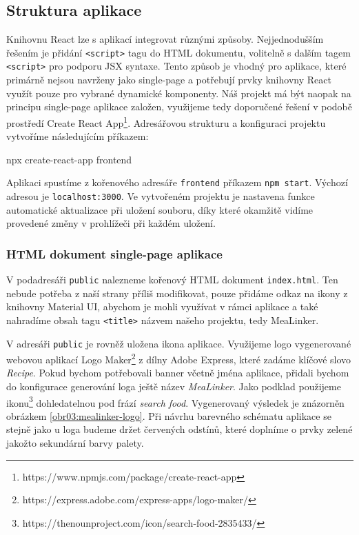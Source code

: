 \subsection{Struktura aplikace}

Knihovnu React lze s aplikací integrovat různými způsoby. Nejjednodušším řešením je přidání \texttt{<script>} tagu do HTML dokumentu, volitelně s dalším tagem \texttt{<script>} pro podporu JSX syntaxe. Tento způsob je vhodný pro aplikace, které primárně nejsou navrženy jako single-page a potřebují prvky knihovny React využít pouze pro vybrané dynamické komponenty. Náš projekt má být naopak na principu single-page aplikace založen, využijeme tedy doporučené řešení v podobě prostředí Create React App\footnote{https://www.npmjs.com/package/create-react-app}. Adresářovou strukturu a konfiguraci projektu vytvoříme následujícím příkazem:
\begin{code}
npx create-react-app frontend
\end{code}

Aplikaci spustíme z kořenového adresáře \texttt{frontend} příkazem \texttt{npm\,start}. Výchozí adresou je \texttt{localhost:3000}. Ve vytvořeném projektu je nastavena funkce automatické aktualizace při uložení souboru, díky které okamžitě vidíme provedené změny v prohlížeči při každém uložení.

\subsubsection{HTML dokument single-page aplikace}

V podadresáři \texttt{public} nalezneme kořenový HTML dokument \texttt{index.html}. Ten nebude potřeba z naší strany příliš modifikovat, pouze přidáme odkaz na ikony z knihovny Material UI, abychom je mohli využívat v rámci aplikace a také nahradíme obsah tagu \texttt{<title>} názvem našeho projektu, tedy MeaLinker.

V adresáři \texttt{public} je rovněž uložena ikona aplikace. Využijeme logo vygenerované webovou aplikací Logo Maker\footnote{https://express.adobe.com/express-apps/logo-maker/} z dílny Adobe Express, které zadáme klíčové slovo \emph{Recipe}. Pokud bychom potřebovali banner včetně jména aplikace, přidali bychom do konfigurace generování loga ještě název \emph{MeaLinker}. Jako podklad použijeme ikonu\footnote{https://thenounproject.com/icon/search-food-2835433/} dohledatelnou pod frází \emph{search food}. Vygenerovaný výsledek je znázorněn obrázkem \ref{obr03:mealinker-logo}. Při návrhu barevného schématu aplikace se stejně jako u loga budeme držet červených odstínů, které doplníme o prvky zelené jakožto sekundární barvy palety.

